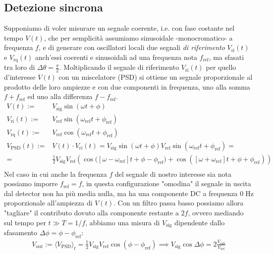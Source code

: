 \documentclass{article}[a4paper, oneside, 11pt]
\begin{document}
\subsection{Detezione sincrona}
Supponiamo di voler misurare un segnale coerente, i.e. con fase costante
nel tempo $V(t)$, che per semplicità assumiamo sinusoidale -monocromatico- a
frequenza $f$, e di generare con oscillatori locali due segnali
\emph{di riferimento} $V_{\text{ri}} (t)$ e $V_{\text{rq}} (t)$ anch'essi
coerenti e sinusoidali ad una frequenza nota $f_{\text{ref}}$, ma sfasati tra
loro di $\Delta \theta = \frac{\pi}{2}$.
Moltiplicando il segnale di riferimento
$V_{\text{ri}} (t)$ per quello d'interesse $V(t)$ con un miscelatore (PSD)
si ottiene un segnale proporzionale al prodotto delle loro ampiezze e con
due componenti in frequenza, uno alla somma $f + f_{\text{ref}}$ ed uno
alla differenza $f - f_{\text{ref}}$.
\begin{align*}
	V(t) :=& V_{\text{sig}}\sin{(\omega t + \phi)} \\
	V_{\text{ri}}(t) :=& V_{\text{ref}}\sin{(\omega_{\text{ref}}t + \phi_{\text{ref}})} \\
	V_{\text{rq}}(t) :=& V_{\text{ref}}\cos{(\omega_{\text{ref}}t + \phi_{\text{ref}})} \\
	V_{\text{PSD}}(t) :=& V(t) \cdot V_{\text{ri}}(t) =
	V_{\text{sig}}\sin{(\omega t + \phi)} 
	V_{\text{ref}}\sin{(\omega_{\text{ref}}t + \phi_{\text{ref}})} = \\
	=& \frac{1}{2} V_{\text{sig}} V_{\text{ref}} \left(\cos{([\omega - 
		\omega_{\text{ref}}]t + \phi - \phi_{\text{ref}}}) + 
	\cos{([\omega + \omega_{\text{ref}}]t + \phi + \phi_{\text{ref}})} \right) \\
\end{align*}
Nel caso in cui anche la frequenza $f$ del segnale di nostro interesse sia
nota possiamo imporre $f_{\text{ref}} = f$, in questa configurazione "omodina"
il segnale in uscita dal detector non ha più media nulla, ma ha una componente
DC a frequenza $0 \; \si{\hertz}$ proporzionale all'ampiezza di $V(t)$.
Con un filtro passa basso possiamo allora "tagliare" il contributo dovuto
alla componente restante a $2f$, ovvero mediando sul tempo per 
$t \gg T = 1/f$, abbiamo una misura di $V_{\text{sig}}$ dipendente dallo
sfasamento $\Delta \phi = \phi - \phi_{\text{ref}}$: 
\begin{align}
	V_{\text{out}} := \langle V_{\text{PSD}} \rangle_t 
	= \frac{1}{2} V_{\text{sig}} V_{\text{ref}}\cos{(\phi - \phi_{\text{ref}})}
	\implies V_{\text{sig}}\cos{\Delta \phi} =
	2 \frac{V_{\text{out}}}{V_{\text{ref}}}
\end{align}
\end{document}
